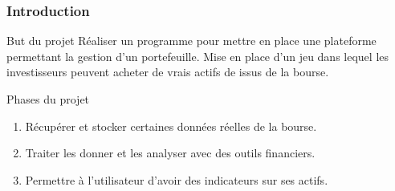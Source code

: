 
\begin{frame}
    \frametitle{Introduction}    		
    \begin{block}{But du projet}
	Réaliser un programme pour mettre en place une plateforme permettant la gestion d'un portefeuille. Mise en place d'un jeu dans lequel les investisseurs peuvent acheter de vrais actifs de issus de la bourse.
    \end{block}

    \begin{block}{Phases du projet}
	\begin{enumerate}
	 \item Récupérer et stocker certaines données réelles de la bourse.
	 \item Traiter les donner et les analyser avec des outils financiers.
	 \item Permettre à l'utilisateur d'avoir des indicateurs sur ses actifs.
	\end{enumerate}

    \end{block}

\end{frame}